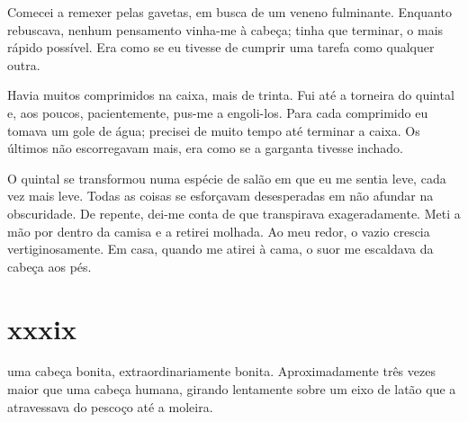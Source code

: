 Comecei a remexer pelas gavetas, em busca de um veneno fulminante. Enquanto
rebuscava, nenhum pensamento vinha-me à cabeça; tinha que terminar, o mais
rápido possível. Era como se eu tivesse de cumprir uma tarefa como qualquer
outra. 




Havia muitos comprimidos na caixa, mais de trinta. Fui até a torneira do
quintal e, aos poucos, pacientemente, pus-me a engoli-los. Para cada
comprimido eu tomava um gole de água; precisei de muito tempo até terminar a
caixa. Os últimos não escorregavam mais, era como se a garganta tivesse
inchado.


O quintal se transformou numa espécie de salão em que eu me sentia leve, cada
vez mais leve. Todas as coisas se esforçavam desesperadas em não afundar na
obscuridade. De repente, dei-me conta de que transpirava exageradamente. Meti
a mão por dentro da camisa e a retirei molhada. Ao meu redor, o vazio crescia
vertiginosamente. Em casa, quando me atirei à cama, o suor me escaldava da
cabeça aos pés.

\section{xxxix} 

 uma cabeça bonita, extraordinariamente bonita. Aproximadamente três vezes maior que uma cabeça humana, girando lentamente sobre um eixo de latão que a atravessava do pescoço até a moleira.

